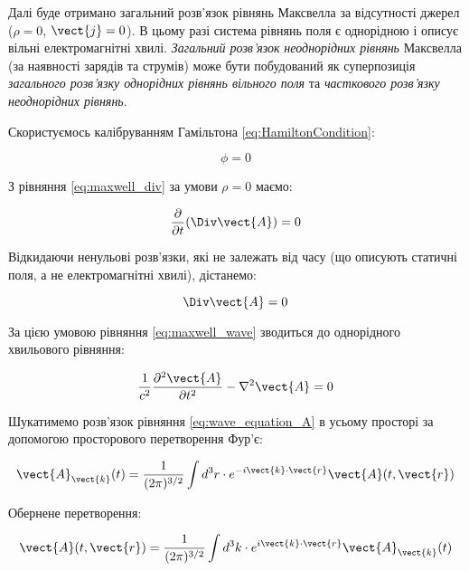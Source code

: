 Далі буде отримано загальний розв’язок рівнянь Максвелла за відсутності джерел (\(\rho = 0\), \(\vect{j} = 0\)). В цьому разі система рівнянь поля є
однорідною і описує вільні електромагнітні хвилі. \textit{Загальний розв’язок} \textit{неоднорідних рівнянь} Максвелла (за наявності зарядів та струмів)
може бути побудований як суперпозиція \textit{загального розв’язку однорідних рівнянь вільного поля} та \textit{часткового розв’язку неоднорідних
рівнянь}.

Скористуємось калібруванням Гамільтона \eqref{eq:HamiltonCondition}:

\begin{equation}
\phi = 0
\label{eq:phi_zero}
\end{equation}

З рівняння \eqref{eq:maxwell_div} за умови \(\rho = 0\) маємо:

\begin{equation*}
\frac{\partial}{\partial t} (\Div\vect{A}) = 0
\end{equation*}

Відкидаючи ненульові розв’язки, які не залежать від часу (що описують статичні поля, а не електромагнітні хвилі), дістанемо:

\begin{equation}
\Div\vect{A} = 0
\label{eq:div_A_zero}
\end{equation}

За цією умовою рівняння \eqref{eq:maxwell_wave} зводиться до однорідного хвильового рівняння:

\begin{equation}
\frac{1}{c^2} \frac{\partial^2 \vect{A}}{\partial t^2} - \nabla^2 \vect{A} = 0
\label{eq:wave_equation_A}
\end{equation}

Шукатимемо розв’язок рівняння \eqref{eq:wave_equation_A} в усьому просторі за допомогою просторового перетворення Фур’є:

\begin{equation}
\vect{A}_{\vect{k}}(t) = \frac{1}{(2\pi)^{3/2}} \int d^3r \cdot e^{-i\vect{k} \cdot \vect{r}} \vect{A}(t, \vect{r})
\label{eq:fourier_transform_A}
\end{equation}

Обернене перетворення:

\begin{equation}
\vect{A}(t, \vect{r}) = \frac{1}{(2\pi)^{3/2}} \int d^3k \cdot e^{i\vect{k} \cdot \vect{r}} \vect{A}_{\vect{k}}(t)
\label{eq:inverse_fourier_transform_A}
\end{equation}


